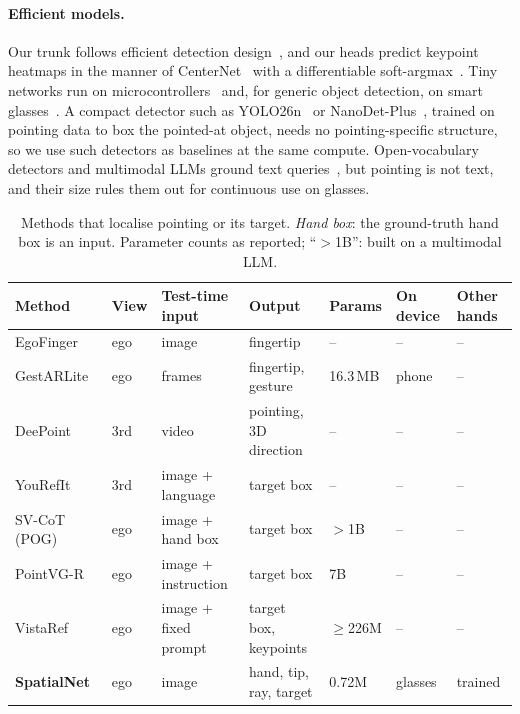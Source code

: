 \paragraph{Efficient models.} Our trunk follows efficient detection design~\cite{ma2018shufflenet,tan2020efficientdet}, and our heads predict keypoint heatmaps in the manner of CenterNet~\cite{zhou2019objects} with a differentiable soft-argmax~\cite{sun2018integral}. Tiny networks run on microcontrollers~\cite{lin2020mcunet} and, for generic object detection, on smart glasses~\cite{moosmann2024tinyissimoyolo}. A compact detector such as YOLO26n~\cite{ultralytics2026yolo26} or NanoDet-Plus~\cite{rangilyu2021nanodet}, trained on pointing data to box the pointed-at object, needs no pointing-specific structure, so we use such detectors as baselines at the same compute. Open-vocabulary detectors and multimodal LLMs ground text queries~\cite{liu2024grounding,peng2023kosmos,you2024ferret,bai2025qwen25vl}, but pointing is not text, and their size rules them out for continuous use on glasses.

\begin{table}[t]
  \caption{Methods that localise pointing or its target. \emph{Hand box}: the ground-truth hand box is an input. Parameter counts as reported; ``$>$1B'': built on a multimodal LLM.}
  \label{tab:related}
  \footnotesize
  \setlength{\tabcolsep}{3pt}
  \begin{tabular}{lllllll}
    \toprule
    Method & View & Test-time input & Output & Params & On device & Other hands \\
    \midrule
    EgoFinger~\cite{huang2016pointing} & ego & image & fingertip & -- & -- & -- \\
    GestARLite~\cite{jain2019gestarlite} & ego & frames & fingertip, gesture & 16.3\,MB & phone & -- \\
    DeePoint~\cite{nakamura2023deepoint} & 3rd & video & pointing, 3D direction & -- & -- & -- \\
    YouRefIt~\cite{chen2021yourefit} & 3rd & image + language & target box & -- & -- & -- \\
    SV-CoT (POG)~\cite{egopoint} & ego & image + hand box & target box & $>$1B & -- & -- \\
    PointVG-R~\cite{li2026pointvgr} & ego & image + instruction & target box & 7B & -- & -- \\
    VistaRef~\cite{li2026vistaref} & ego & image + fixed prompt & target box, keypoints & $\geq$226M & -- & -- \\
    \textbf{SpatialNet} & ego & image & hand, tip, ray, target & 0.72M & glasses & trained \\
    \bottomrule
  \end{tabular}
\end{table}
